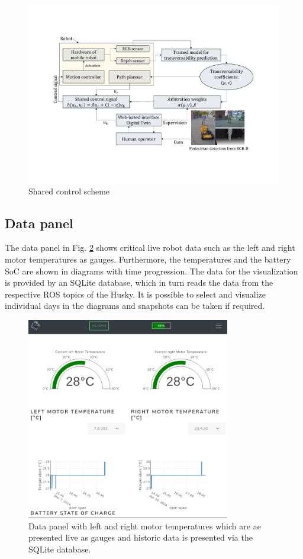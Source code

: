 \documentclass[letterpaper, 10 pt, conference]{ieeeconf}  %
\begin{document}
   \begin{figure}[hb]
	\centerline{\includegraphics[width=\columnwidth]{images/transversability2.pdf}}
	\caption{Shared control scheme}
	\label{fig:architecture}
\end{figure}

\subsection{Data panel}
The data panel in Fig. \ref{fig:overviewplots} shows critical live robot data such as the left and right motor temperatures as gauges. 
Furthermore, the temperatures and the battery SoC are shown in diagrams with time progression. 
The data for the visualization is provided by an SQLite database, which in turn reads the data from the respective ROS topics of the Husky. 
It is possible to select and visualize individual days in the diagrams and snapshots can be taken if required.
\begin{figure}[t]
    \centerline{\includegraphics[width=8.9cm]{images/tabletdatasm.png}}
    \caption{Data panel with left and right motor temperatures which are ae presented live as gauges and historic data is presented via the SQLite database.}
    \label{fig:overviewplots}
\end{figure}
\end{document}
